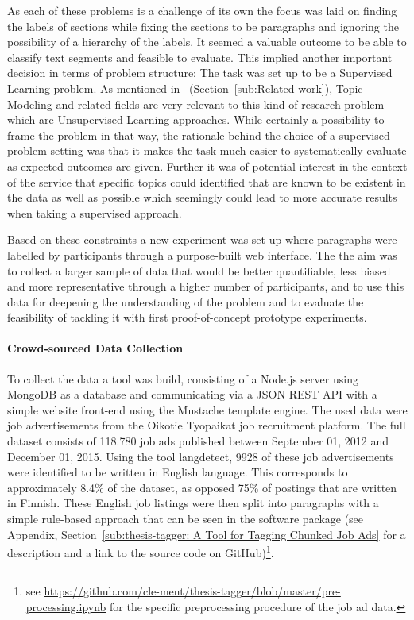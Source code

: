 As each of these problems is a challenge of its own the focus was laid on finding the labels of sections while fixing the sections to be paragraphs and ignoring the possibility of a hierarchy of the labels. It seemed a valuable outcome to be able to classify text segments and feasible to evaluate.
This implied another important decision in terms of problem structure: The task was set up to be a \gls{Supervised Learning} problem. As mentioned in~ (Section~\ref{sub:Related work}), \gls{Topic Modeling} and related fields are very relevant to this kind of research problem which are \gls{Unsupervised Learning} approaches.
While certainly a possibility to frame the problem in that way, the rationale behind the choice of a supervised problem setting was that it makes the task much easier to systematically evaluate as expected outcomes are given. Further it was of potential interest in the context of the service that specific topics could identified that are known to be existent in the data as well as possible which seemingly could lead to more accurate results when taking a supervised approach.

Based on these constraints a new experiment was set up where paragraphs were labelled by participants through a purpose-built web interface. The the aim was to collect a larger sample of data that would be better quantifiable, less biased and more representative through a higher number of participants, and to use this data for deepening the understanding of the problem and to evaluate the feasibility of tackling it with first proof-of-concept prototype experiments.

\paragraph{Crowd-sourced Data Collection}
\label{par:Crowd-sourced Data Collection}

To collect the data a tool was build, consisting of a \gls{Node.js} server using \gls{MongoDB} as a database and communicating via a \acrshort{JSON} \acrshort{REST} \acrshort{API} with a simple website front-end using the \gls{Mustache} template engine.
The used data were job advertisements from the \gls{Oikotie Tyopaikat} job recruitment platform. The full dataset consists of 118.780 job ads published between September 01, 2012 and December 01, 2015. Using the tool \gls{langdetect}, 9928 of these job advertisements were identified to be written in English language. This corresponds to approximately 8.4\% of the dataset, as opposed 75\% of postings that are written in Finnish. These English job listings were then split into paragraphs with a simple rule-based approach that can be seen in the software package (see Appendix, Section~\ref{sub:thesis-tagger: A Tool for Tagging Chunked Job Ads} for a description and a link to the source code on \gls{GitHub})\footnote{see \url{https://github.com/cle-ment/thesis-tagger/blob/master/pre-processing.ipynb} for the specific preprocessing procedure of the job ad data.}.

